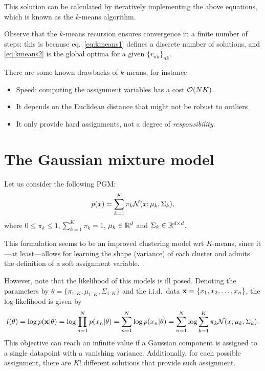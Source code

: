This solution can be calculated by iteratively implementing the above equations, which is known as the $k$-means algorithm. 

\begin{remark}
    Observe that the $k$-means recursion ensures convergence in a finite number of steps: this is because eq.~\eqref{eq:kmeans1} defines a discrete number of solutions, and \eqref{eq:kmeans2} is the global optima for a given $\{r_{nk}\}_{nk}$.
\end{remark}

There are some known drawbacks of $k$-means, for instance 
\begin{itemize}
    \item Speed: computing the assignment variables has a cost ${\mathcal O}(NK)$. 
    \item It depends on the Euclidean distance that might not be robust to outliers
    \item It only provide hard assignments, not a degree of \emph{responsibility}.  
\end{itemize}

\section{The Gaussian mixture model}

Let us consider the following PGM: 
\begin{equation}
    p(x) = \sum_{k=1}^{K} \pi_k {\mathcal N}(x; \mu_k,\Sigma_k),
\end{equation}
where $0\leq \pi_k \leq 1, \sum_{k=1}^{K}\pi_k=1$, $\mu_k\in{\mathbb R}^d$ and $\Sigma_k\in{\mathbb R}^{d\times d}$.

This formulation seems to be an improved clustering model wrt $K$-means, since it---at least---allows for learning the shape (variance) of each cluster and admits the definition of a soft assignment variable.

However, note that the likelihood of this models is ill posed. Denoting the parameters by $\theta = \{\pi_{1:K},\mu_{1:K}, \Sigma_{1:K}\}$ and the i.i.d.~data ${ \mathbf{x}} =\{x_1,x_2,\ldots,x_n\}$, the log-likelihood is given by 
\begin{equation}
    l(\theta) = \log p({ \mathbf{x}}|\theta) = \log\prod_{n=1}^{N} p(x_n|\theta) = \sum_{n=1}^{N} \log p(x_n|\theta) = \sum_{n=1}^{N} \log \sum_{k=1}^{K} \pi_k {\mathcal N}(x; \mu_k,\Sigma_k).
    \label{eq:likelihood_GMM}
\end{equation}
This objective can reach an infinite value if a Gaussian component is assigned to a single datapoint with a vanishing variance. Additionally, for each possible assignment, there are $K!$ different solutions that provide such assignment.  

